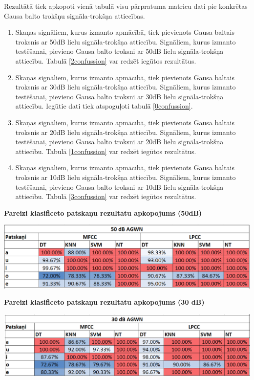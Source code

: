 \documentclass[12pt,paper=A4]{report}
\begin{document}
Rezultātā tiek apkopoti vienā tabulā visu pārpratuma matricu dati pie konkrētas Gausa balto trokšņu signāla-trokšņa attiecības. 

\begin{enumerate}


\item Skaņas signāliem, kurus izmanto apmācībā, tiek pievienots Gausa baltais troksnis
ar 50dB lielu signāla-trokšņa attiecību. Signāliem, kurus izmanto testēšanai, pievieno
Gausa balto troksni ar 50dB lielu signāla-trokšņa attiecību. Tabulā \ref{2confussion} var redzēt iegūtos rezultātus.


\item Skaņas signāliem, kurus izmanto apmācībā, tiek pievienots Gausa baltais troksnis
ar 30dB lielu signāla-trokšņa attiecību. Signāliem, kurus izmanto testēšanai, pievieno
Gausa balto troksni ar 30dB lielu signāla-trokšņa attiecību. 
 Iegūtie dati tiek atspoguļoti tabulā \ref{0confussion}.
 
\item Skaņas signāliem, kurus izmanto apmācībā, tiek pievienots Gausa baltais troksnis
ar 20dB lielu signāla-trokšņa attiecību. Signāliem, kurus izmanto testēšanai, pievieno
Gausa balto troksni ar 20dB lielu signāla-trokšņa attiecību. Tabulā \ref{1confussion} var redzēt iegūtos rezultātus. 


\item Skaņas signāliem, kurus izmanto apmācībā, tiek pievienots Gausa baltais troksnis
ar 10dB lielu signāla-trokšņa attiecību. Signāliem, kurus izmanto testēšanai, pievieno
Gausa balto troksni ar 10dB lielu signāla-trokšņa attiecību. Tabulā \ref{3confussion} var redzēt iegūtos rezultātus.

\end{enumerate}

\begin{table}[H]
\caption{}
\captionsetup{justification=centering}
\caption*{\textbf{Pareizi klasificēto patskaņu rezultātu apkopojums (50dB)}}
\includegraphics[width=1.00\textwidth, left]{2confussion} 
\label{2confussion} 
\end{table}
 
\begin{table}[H]
\caption{}
\captionsetup{justification=centering}
\caption*{\textbf{Pareizi klasificēto patskaņu rezultātu apkopojums (30 dB)}}
\includegraphics[width=1.00\textwidth, left]{0confussion} 
\label{0confussion} 
\end{table}
\end{document}
